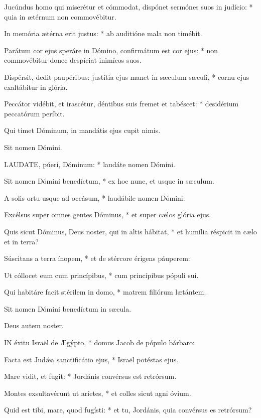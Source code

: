 Jucúndus homo qui miserétur et cómmodat, dispónet sermónes suos in judício: * quia in ætérnum non commovébitur.

In memória ætérna erit justus: * ab auditióne mala non timébit.

Parátum cor ejus speráre in Dómino, confirmátum est cor ejus: * non commovébitur donec despíciat inimícos suos.

Dispérsit, dedit paupéribus: justítia ejus manet in sæculum sæculi, * cornu ejus exaltábitur in glória.

Peccátor vidébit, et irascétur, déntibus suis fremet et tabéscet: * desidérium peccatórum períbit.

 Qui timet Dóminum, in mandátis ejus cupit nimis.

 Sit nomen Dómini.


\lettrine[lines=2]{L}{AUDATE}, púeri, Dóminum: * laudáte nomen Dómini.

Sit nomen Dómini benedíctum, * ex hoc nunc, et usque in sæculum.

A solis ortu usque ad occásum, * laudábile nomen Dómini.

Excélsus super omnes gentes Dóminus, * et super cælos glória ejus.

Quis sicut Dóminus, Deus noster, qui in altis hábitat, * et humília réspicit in cælo et in terra?

Súscitans a terra ínopem, * et de stércore érigens páuperem:

Ut cóllocet eum cum princípibus, * cum princípibus pópuli sui.

Qui habitáre facit stérilem in domo, * matrem filiórum lætántem.

 Sit nomen Dómini benedíctum in sæcula.

 Deus autem noster.


\lettrine[lines=2]{I}{N} éxitu Israël de Ægýpto, * domus Jacob de pópulo bárbaro:

Facta est Judǽa sanctificátio ejus, * Israël potéstas ejus.

Mare vidit, et fugit: * Jordánis convérsus est retrórsum.

Montes exsultavérunt ut aríetes, * et colles sicut agni óvium.

Quid est tibi, mare, quod fugísti: * et tu, Jordánis, quia convérsus es retrórsum?

